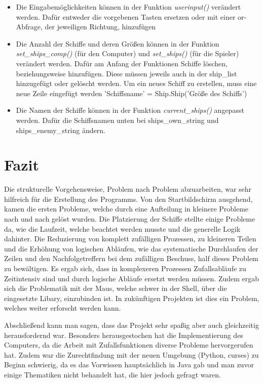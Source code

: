 \documentclass{llncs}
\begin{document}
\begin{itemize}
    \item Die Eingabemöglichkeiten können in der Funktion \emph{userinput()} verändert werden. Dafür entweder die vorgebenen Tasten ersetzen oder mit einer \glqq or\grqq{}-Abfrage, der jeweiligen Richtung, hinzufügen
    \item Die Anzahl der Schiffe und deren Größen können in der Funktion \emph{set\_ships\_comp()} (für den Computer) und \emph{set\_ships()} (für die Spieler) verändert werden. Dafür am Anfang der Funktionen Schiffe löschen, beziehungsweise hinzufügen. Diese müssen jeweils auch in der \glqq ship\_list\grqq{} hinzugefügt oder gelöscht werden. Um ein neues Schiff zu erstellen, muss eine neue Zeile eingefügt werden\: \glqq 'Schiffsname' = Ship.Ship('Größe des Schiffs')\grqq{}
    \item Die Namen der Schiffe können in der Funktion \emph{current\_ships()} angepasst werden. Dafür die Schiffsnamen unten bei \glqq ships\_own\_string\grqq{} und \glqq ships\_enemy\_string\grqq{} ändern.
\end{itemize}

\section{Fazit}

Die strukturelle Vorgehensweise, Problem nach Problem abzuarbeiten, war sehr hilfreich für die Erstellung des Programms. Von den Startbildschirm ausgehend, kamen die ersten Probleme,
welche durch eine Aufteilung in kleinere Probleme nach und nach gelöst wurden. Die Platzierung der Schiffe stellte einige Probleme da, wie die Laufzeit, welche beachtet werden musste 
und die generelle Logik dahinter. Die Reduzierung von komplett zufälligen Prozessen, zu kleineren Teilen und die Erhöhung von logischen Abläufen, wie das systematische Durchlaufen der Zeilen
und den Nachfolgetreffern bei dem zufälligen Beschuss, half dieses Problem zu bewältigen. Es ergab sich, dass in komplexeren Prozessen Zufallsabläufe zu Zeitintensiv sind und durch
logische Abläufe ersetzt werden müssen. Zudem ergab sich die Problematik mit der Maus, welche schwer in der Shell, über die eingesetzte Libary, einzubinden ist. In zukünftigen Projekten
ist dies ein Problem, welches weiter erforscht werden kann.

Abschließend kann man sagen, dass das Projekt sehr spaßig aber auch gleichzeitig herausfordernd war. Besonders herausgestochen hat die Implementierung des Computers, da
die Arbeit mit Zufallsfunktionen diverse Probleme hervorgerufen hat. Zudem war die Zurechtfindung mit der neuen Umgebung (Python, curses) zu Beginn schwierig, da es das Vorwissen
hauptsächlich in Java gab und man zuvor einige Thematiken nicht behandelt hat, die hier jedoch gefragt waren.
\end{document}
